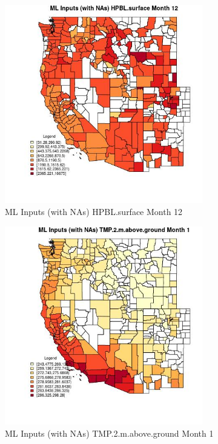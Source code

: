 \begin{figure} 
\centering  
\includegraphics[width=0.77\textwidth]{Code_Outputs/Report_ML_input_PM25_Step4_part_f_de_duplicated_aves_prioritize_24hr_obswNAs_CountyHPBLsurfacemedianMonth12.jpg} 
\caption{\label{fig:Report_ML_input_PM25_Step4_part_f_de_duplicated_aves_prioritize_24hr_obswNAsCountyHPBLsurfacemedianMonth12}ML Inputs (with NAs) HPBL.surface Month 12} 
\end{figure} 
 

\begin{figure} 
\centering  
\includegraphics[width=0.77\textwidth]{Code_Outputs/Report_ML_input_PM25_Step4_part_f_de_duplicated_aves_prioritize_24hr_obswNAs_CountyTMP2mabovegroundmedianMonth1.jpg} 
\caption{\label{fig:Report_ML_input_PM25_Step4_part_f_de_duplicated_aves_prioritize_24hr_obswNAsCountyTMP2mabovegroundmedianMonth1}ML Inputs (with NAs) TMP.2.m.above.ground Month 1} 
\end{figure} 
 

